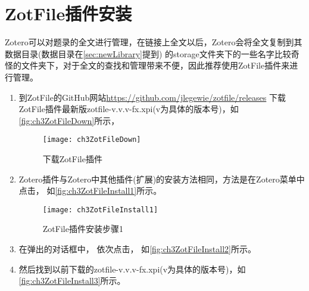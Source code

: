 \documentclass[cn,11pt,chinese]{elegantbook}
\begin{document}
		\section{ ZotFile插件安装}\label{sec:ZotFileInstall}
		Zotero可以对题录的全文进行管理，在链接上全文以后，Zotero会将全文复制到其数据目录(数据目录在\cref{sec:newLibrary}提到)
		的storage文件夹下的一些名字比较奇怪的文件夹下，对于全文的查找和管理带来不便，因此推荐使用ZotFile插件来进行管理。
		\begin{enumerate}
			\item 到ZotFile的GitHub网站\url{https://github.com/jlegewie/zotfile/releases}
			下载ZotFile插件最新版zotfile-v.v.v-fx.xpi(v为具体的版本号)，如\autoref{fig:ch3ZotFileDown}所示，
			\begin{figure}
				\centering
				\texttt{[image: ch3ZotFileDown]}
				\caption{下载ZotFile插件}
				\label{fig:ch3ZotFileDown}
			\end{figure}
			
			\item
			Zotero插件与Zotero中其他插件(扩展)的安装方法相同，方法是在Zotero菜单中点击，
			如\autoref{fig:ch3ZotFileInstall1}所示。
			\begin{figure}[htbp]
				\centering
				\texttt{[image: ch3ZotFileInstall1]}
				\caption{ZotFile插件安装步骤1}
				\label{fig:ch3ZotFileInstall1}
			\end{figure}
			\item
			在弹出的对话框中，
			依次点击，
			如\autoref{fig:ch3ZotFileInstall2}所示。
			\item
			然后找到以前下载的zotfile-v.v.v-fx.xpi(v为具体的版本号)，如\autoref{fig:ch3ZotFileInstall3}所示。
			

\end{enumerate}
\end{document}

